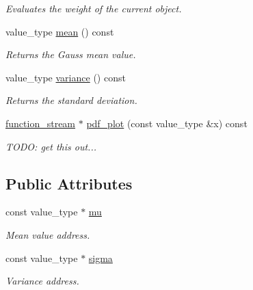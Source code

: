 \begin{DoxyCompactItemize}
\begin{DoxyCompactList}\small\item\em Evaluates the weight of the current object. \end{DoxyCompactList}\item 
\hypertarget{a00385_aef57350f99b72663bc2d783eb524312a}{}value\+\_\+type \hyperlink{a00385_aef57350f99b72663bc2d783eb524312a}{mean} () const \label{a00385_aef57350f99b72663bc2d783eb524312a}

\begin{DoxyCompactList}\small\item\em Returns the Gauss mean value. \end{DoxyCompactList}\item 
\hypertarget{a00385_a3bde918d60c0e94bb42fa3621701f076}{}value\+\_\+type \hyperlink{a00385_a3bde918d60c0e94bb42fa3621701f076}{variance} () const \label{a00385_a3bde918d60c0e94bb42fa3621701f076}

\begin{DoxyCompactList}\small\item\em Returns the standard deviation. \end{DoxyCompactList}\item 
\hypertarget{a00385_a391a356dc08f2d549f7bb85b9b46bab1}{}\hyperlink{a00235}{function\+\_\+stream} $\ast$ \hyperlink{a00385_a391a356dc08f2d549f7bb85b9b46bab1}{pdf\+\_\+plot} (const value\+\_\+type \&x) const \label{a00385_a391a356dc08f2d549f7bb85b9b46bab1}

\begin{DoxyCompactList}\small\item\em T\+O\+D\+O\+: get this out... \end{DoxyCompactList}\end{DoxyCompactItemize}
\subsection*{Public Attributes}
\begin{DoxyCompactItemize}
\item 
\hypertarget{a00385_acdc632d3b47eca58b47c94030311dca4}{}const value\+\_\+type $\ast$ \hyperlink{a00385_acdc632d3b47eca58b47c94030311dca4}{mu}\label{a00385_acdc632d3b47eca58b47c94030311dca4}

\begin{DoxyCompactList}\small\item\em Mean value address. \end{DoxyCompactList}\item 
\hypertarget{a00385_abf64e0c0479116b3ffce47d39ad43df2}{}const value\+\_\+type $\ast$ \hyperlink{a00385_abf64e0c0479116b3ffce47d39ad43df2}{sigma}\label{a00385_abf64e0c0479116b3ffce47d39ad43df2}

\begin{DoxyCompactList}\small\item\em Variance address. \end{DoxyCompactList}\end{DoxyCompactItemize}


